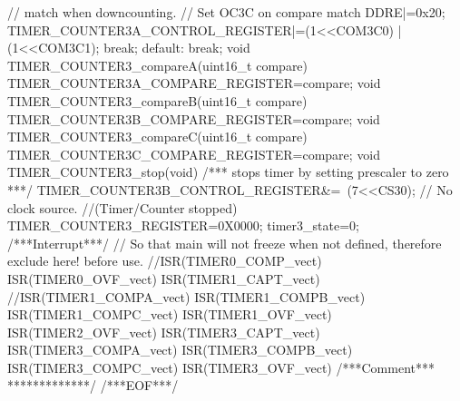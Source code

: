 \begin{verbatimtab}
{{		// match when downcounting.
		// Set OC3C on compare match
		DDRE|=0x20;
		TIMER_COUNTER3A_CONTROL_REGISTER|=(1<<COM3C0) | (1<<COM3C1);
		break;
		default:
		break;
	}
}
void TIMER_COUNTER3_compareA(uint16_t compare)
{
	TIMER_COUNTER3A_COMPARE_REGISTER=compare;
}
void TIMER_COUNTER3_compareB(uint16_t compare)
{
	TIMER_COUNTER3B_COMPARE_REGISTER=compare;
}
void TIMER_COUNTER3_compareC(uint16_t compare)
{
	TIMER_COUNTER3C_COMPARE_REGISTER=compare;
}
void TIMER_COUNTER3_stop(void)
/***
stops timer by setting prescaler to zero
***/
{
	TIMER_COUNTER3B_CONTROL_REGISTER&=~(7<<CS30); // No clock source.
	//(Timer/Counter stopped)
	TIMER_COUNTER3_REGISTER=0X0000;
	timer3_state=0;
}
/***Interrupt***/
// So that main will not freeze when not defined, therefore exclude here! before use.
//ISR(TIMER0_COMP_vect){ }
ISR(TIMER0_OVF_vect){ }
ISR(TIMER1_CAPT_vect){ }
//ISR(TIMER1_COMPA_vect){ }
ISR(TIMER1_COMPB_vect){ }
ISR(TIMER1_COMPC_vect){ }
ISR(TIMER1_OVF_vect){ }
ISR(TIMER2_OVF_vect){ }
ISR(TIMER3_CAPT_vect){ }
ISR(TIMER3_COMPA_vect){ }
ISR(TIMER3_COMPB_vect){ }
ISR(TIMER3_COMPC_vect){ }
ISR(TIMER3_OVF_vect){ }
/***Comment***
*************/
/***EOF***/
\end{verbatimtab}